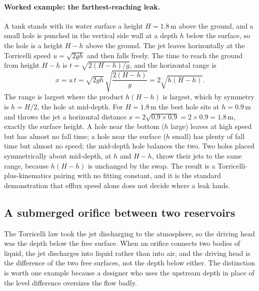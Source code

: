 \paragraph{Worked example: the farthest-reaching leak.} A tank stands
with its water surface a height $H = 1.8\,\si{\meter}$ above the ground,
and a small hole is punched in the vertical side wall at a depth $h$
below the surface, so the hole is a height $H - h$ above the ground. The
jet leaves horizontally at the Torricelli speed $u = \sqrt{2gh}$ and
then falls freely. The time to reach the ground from height $H - h$ is
$t = \sqrt{2(H - h)/g}$, and the horizontal range is
\[
x = u\,t = \sqrt{2gh}\,\sqrt{\frac{2(H - h)}{g}}
= 2\sqrt{h(H - h)}.
\]
The range is largest where the product $h(H - h)$ is largest, which by
symmetry is $h = H/2$, the hole at mid-depth. For $H = 1.8\,\si{\meter}$
the best hole sits at $h = 0.9\,\si{\meter}$ and throws the jet a
horizontal distance $x = 2\sqrt{0.9\times 0.9} = 2\times 0.9 =
1.8\,\si{\meter}$, exactly the surface height. A hole near the bottom
($h$ large) leaves at high speed but has almost no fall time; a hole
near the surface ($h$ small) has plenty of fall time but almost no
speed; the mid-depth hole balances the two. Two holes placed
symmetrically about mid-depth, at $h$ and $H - h$, throw their jets to
the same range, because $h(H - h)$ is unchanged by the swap. The result
is a Torricelli-plus-kinematics pairing with no fitting constant, and it
is the standard demonstration that efflux speed alone does not decide
where a leak lands.

\subsection{A submerged orifice between two reservoirs}

The Torricelli law took the jet discharging to the atmosphere, so the
driving head was the depth below the free surface. When an orifice
connects two bodies of liquid, the jet discharges into liquid rather
than into air, and the driving head is the difference of the two free
surfaces, not the depth below either. The distinction is worth one
example because a designer who uses the upstream depth in place of the
level difference oversizes the flow badly.

